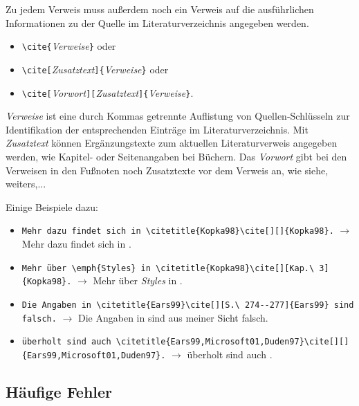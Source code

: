 \noindent%
Zu jedem Verweis muss außerdem noch ein Verweis auf die ausführlichen Informationen zu der Quelle im Literaturverzeichnis angegeben werden.

\begin{itemize}
\item[] \verb!\cite{!\textit{Verweise}\verb!}! oder
\item[] \verb!\cite[!\textit{Zusatztext}\verb!]{!\textit{Verweise}\verb!}! oder
\item[] \verb!\cite[!\textit{Vorwort}\verb!][!\textit{Zusatztext}\verb!]{!\textit{Verweise}\verb!}!.
\end{itemize}

\noindent%
\textit{Verweise} ist eine durch Kommas getrennte Auflistung von Quellen-Schlüsseln
zur Identifikation der entsprechenden Einträge im Literaturverzeichnis.
Mit \textit{Zusatztext} können Ergänzungstexte zum aktuellen Literaturverweis angegeben
werden, wie \zB Kapitel- oder Seitenangaben bei Büchern. Das \textit{Vorwort} gibt bei den Verweisen in den Fußnoten noch Zusatztexte vor dem Verweis an, wie \zB siehe, weiters,...

Einige Beispiele dazu:
\begin{itemize}
\item[] \verb!Mehr dazu findet sich in \citetitle{Kopka98}\cite[][]{Kopka98}.! \newline
      $\rightarrow$ Mehr dazu findet sich in \cite[][]{Kopka98}.
\item[] \verb!Mehr über \emph{Styles} in \citetitle{Kopka98}\cite[][Kap.\ 3]{Kopka98}.! \newline
      $\rightarrow$ Mehr über \emph{Styles} in \cite[][Kap.\ 3]{Kopka98}.
\item[] \verb!Die Angaben in \citetitle{Ears99}\cite[][S.\ 274--277]{Ears99} sind falsch.! \newline
      $\rightarrow$ Die Angaben in \cite[][S.\ 274--277]{Ears99} sind aus meiner Sicht falsch.
\item[] \verb!überholt sind auch \citetitle{Ears99,Microsoft01,Duden97}!\newline\verb!\cite[][]{Ears99,Microsoft01,Duden97}.! \newline
      $\rightarrow$ überholt sind auch \cite[][]{Ears99,Microsoft01,Duden97}.
\end{itemize}



\subsection{Häufige Fehler}

